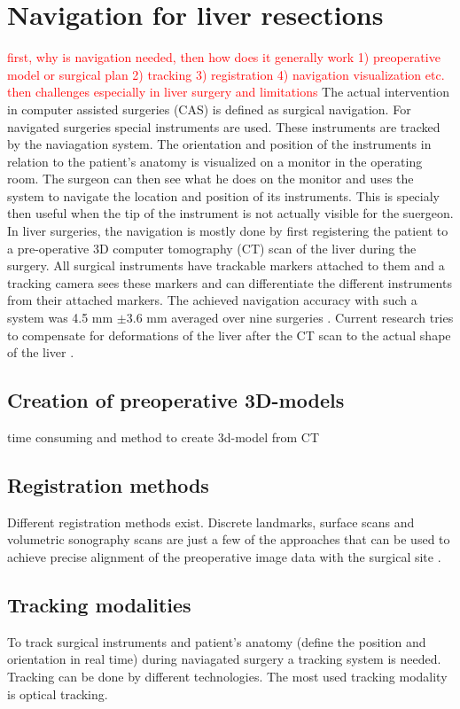 \section{Navigation for liver resections}
\textcolor{red}{first, why is navigation needed, then how does it generally work 1) preoperative model or surgical plan 2) tracking 3) registration 4) navigation visualization etc. then challenges especially in liver surgery and limitations}
The actual intervention in computer assisted surgeries (CAS) is defined as
surgical navigation. For navigated surgeries special instruments are used. These
instruments are tracked by the naviagation system. The orientation and position
of the instruments in relation to the patient's anatomy is visualized on a
monitor in the operating room. The surgeon can then see what he does on the
monitor and uses the system to navigate the location and position of its
instruments. This is specialy then useful when the tip of the instrument is not
actually visible for the suergeon. 
In liver surgeries, the navigation is mostly done by first registering the patient to a pre-operative 3D
computer tomography (CT) scan of the liver during the surgery. All surgical
instruments have trackable markers attached to them and a tracking camera sees
these markers and can differentiate the different instruments from their attached
markers. The achieved
navigation accuracy with such a system was 4.5 mm $\pm$3.6 mm averaged over nine surgeries \cite{peterhans2011navigation}.
Current research tries to compensate for deformations of the liver after the CT
scan to the actual shape of the liver \cite{clements2017deformation}
\cite{clements2015validation}. 
\subsection{Creation of preoperative 3D-models}


\cite{numminen2005preoperative} time consuming and method to create 3d-model
from CT

\subsection{Registration methods}
Different registration methods exist. Discrete landmarks, surface scans and
volumetric sonography scans are just a few of the approaches that can be
used to achieve precise alignment of the preoperative image data with the
surgical site \cite{banz2016intraoperative}.

\subsection{Tracking modalities}
To track surgical instruments and patient's anatomy (define the position and
orientation in real time) during naviagated surgery a tracking system is needed.
Tracking can be done by different technologies. The most used tracking
modality is optical tracking. 

